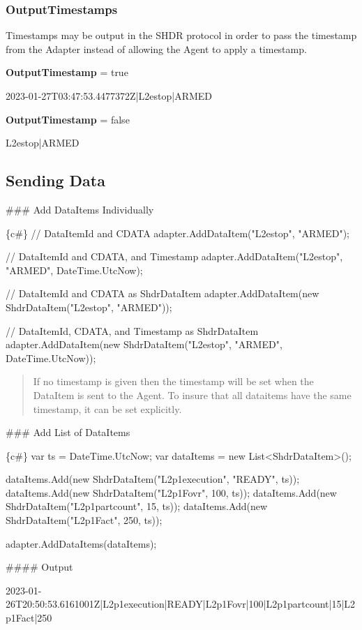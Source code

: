 \subsubsection*{Output\+Timestamps}

Timestamps may be output in the S\+H\+DR protocol in order to pass the timestamp from the Adapter instead of allowing the Agent to apply a timestamp.

{\bfseries Output\+Timestamp} = true 
\begin{DoxyCode}
2023-01-27T03:47:53.4477372Z|L2estop|ARMED
\end{DoxyCode}
 {\bfseries Output\+Timestamp} = false 
\begin{DoxyCode}
L2estop|ARMED
\end{DoxyCode}


\subsection*{Sending Data}

\#\#\# Add Data\+Items Individually 
\begin{DoxyCode}
\{c#\}
// DataItemId and CDATA
adapter.AddDataItem("L2estop", "ARMED");

// DataItemId and CDATA, and Timestamp
adapter.AddDataItem("L2estop", "ARMED", DateTime.UtcNow);

// DataItemId and CDATA as ShdrDataItem
adapter.AddDataItem(new ShdrDataItem("L2estop", "ARMED"));

// DataItemId, CDATA, and Timestamp as ShdrDataItem
adapter.AddDataItem(new ShdrDataItem("L2estop", "ARMED", DateTime.UtcNow));
\end{DoxyCode}
 \begin{quote}
If no timestamp is given then the timestamp will be set when the Data\+Item is sent to the Agent. To insure that all dataitems have the same timestamp, it can be set explicitly. \end{quote}


\#\#\# Add List of Data\+Items 
\begin{DoxyCode}
\{c#\}
var ts = DateTime.UtcNow;
var dataItems = new List<ShdrDataItem>();

dataItems.Add(new ShdrDataItem("L2p1execution", "READY", ts));
dataItems.Add(new ShdrDataItem("L2p1Fovr", 100, ts));
dataItems.Add(new ShdrDataItem("L2p1partcount", 15, ts));
dataItems.Add(new ShdrDataItem("L2p1Fact", 250, ts));

adapter.AddDataItems(dataItems);
\end{DoxyCode}
 \#\#\#\# Output 
\begin{DoxyCode}
2023-01-26T20:50:53.6161001Z|L2p1execution|READY|L2p1Fovr|100|L2p1partcount|15|L2p1Fact|250
\end{DoxyCode}


